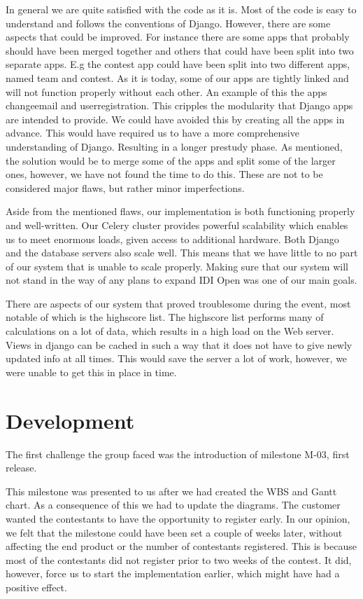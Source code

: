 In general we are quite satisfied with the code as it is. Most of the
code is easy to understand and follows the conventions of Django.
However, there are some aspects that could be improved. For instance
there are some apps that probably should have been merged together and
others that could have been split into two separate apps. E.g the
contest app could have been split into two different apps, named team
and contest. As it is today, some of our apps are tightly linked and
will not function properly without each other. An example of this the
apps changeemail and userregistration. This cripples the modularity
that Django apps are intended to provide. We could have avoided this by
creating all the apps in advance. This would have required us to have a
more comprehensive understanding of Django. Resulting in a longer
prestudy phase. As mentioned, the solution would be to merge some of
the apps and split some of the larger ones, however, we have not found
the time to do this. These are not to be considered major flaws, but
rather minor imperfections. 

Aside from the mentioned flaws, our implementation is both functioning
properly and well-written. Our Celery cluster provides powerful
scalability which enables us to meet enormous loads, given access to
additional hardware. Both Django and the database servers also scale
well. This means that we have little to no part of our system that is
unable to scale properly. Making sure that our system will not stand in
the way of any plans to expand IDI Open was one of our main goals.

There are aspects of our system that proved troublesome during the
event, most notable of which is the highscore list. The highscore list
performs many of calculations on a lot of data, which results in a high
load on the Web server. Views in django can be cached in such a way
that it does not have to give newly updated info at all times. This
would save the server a lot of work, however, we were unable to get
this in place in time. 

\section{Development}

The first challenge the group faced was the introduction of milestone
M-03, first release. 

This milestone was presented to us after we had created the WBS and
Gantt chart. As a consequence of this we had to update the diagrams.
The customer wanted the contestants to have the opportunity to register
early. In our opinion, we felt that the milestone could have been set a
couple of weeks later, without affecting the end product or the number
of contestants registered. This is because most of the contestants did
not register prior to two weeks of the contest. It did, however, force
us to start the implementation earlier, which might have had a positive
effect.

